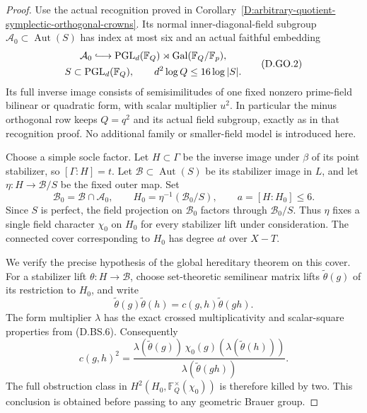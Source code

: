 \begin{proof}
Use the actual recognition proved in
Corollary~\ref{D:arbitrary-quotient-symplectic-orthogonal-crowns}.
Its normal inner-diagonal-field subgroup
$\mathcal A_0\subset\operatorname{Aut}(S)$ has index
at most six and an actual faithful embedding
\[
 \begin{gathered}
 \mathcal A_0\lhook\joinrel\longrightarrow
 \operatorname{PGL}_d(\mathbb F_Q)\rtimes
                  \operatorname{Gal}(\mathbb F_Q/\mathbb F_p),\\
 S\subset\operatorname{PGL}_d(\mathbb F_Q),
 \qquad d^2\log Q\le16\log|S|.
 \end{gathered}                                             \tag{D.GO.2}
\]
Its full inverse image consists of semisimilitudes
of one fixed nonzero prime-field bilinear or quadratic
form, with scalar multiplier $u^2$.
In particular the minus orthogonal row keeps
$Q=q^2$ and its actual field subgroup, exactly as in
that recognition proof. No additional family or
smaller-field model is introduced here.

Choose a simple socle factor. Let $H\subset\Gamma$
be the inverse image under $\beta$ of its point
stabilizer, so $[\Gamma:H]=t$. Let
$\mathcal B\subset\operatorname{Aut}(S)$ be its
stabilizer image in $L$, and let
$\eta:H\to\mathcal B/S$ be the fixed outer map.
Set
\[
 \mathcal B_0=\mathcal B\cap\mathcal A_0,
 \qquad H_0=\eta^{-1}(\mathcal B_0/S),
 \qquad a=[H:H_0]\le6 .                                  \tag{D.GO.3}
\]
Since $S$ is perfect, the field projection on
$\mathcal B_0$ factors through $\mathcal B_0/S$.
Thus $\eta$ fixes a single field character $\chi_0$
on $H_0$ for every stabilizer lift under consideration.
The connected cover corresponding to $H_0$ has degree
$at$ over $X-T$.

We verify the precise hypothesis of the global
hereditary theorem on this cover. For a stabilizer
lift $\theta:H\to\mathcal B$, choose set-theoretic
semilinear matrix lifts $\widetilde\theta(g)$ of
its restriction to $H_0$, and write
\[
 \widetilde\theta(g)\widetilde\theta(h)
       =c(g,h)\widetilde\theta(gh).
\]
The form multiplier $\lambda$ has the exact crossed
multiplicativity and scalar-square properties from
(D.BS.6). Consequently
\[
 c(g,h)^2=
 \frac{\lambda(\widetilde\theta(g))\,
       \chi_0(g)(\lambda(\widetilde\theta(h)))}
      {\lambda(\widetilde\theta(gh))} .                   \tag{D.GO.4}
\]
The full obstruction class in
$H^2(H_0,\mathbb F_Q^\times(\chi_0))$ is therefore
killed by two. This conclusion is obtained before
passing to any geometric Brauer group.


\end{proof}
